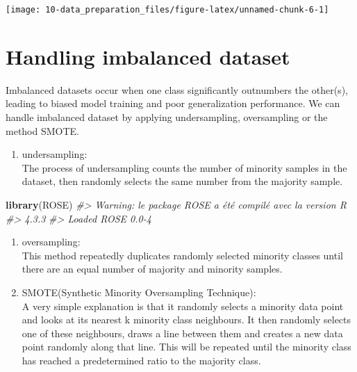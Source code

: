 \documentclass[
]{book}
\newenvironment{Shaded}{\begin{snugshade}}{\end{snugshade}}
\newcommand{\CommentTok}[1]{\textcolor[rgb]{0.56,0.35,0.01}{\textit{#1}}}
\newcommand{\FunctionTok}[1]{\textcolor[rgb]{0.13,0.29,0.53}{\textbf{#1}}}
\newcommand{\NormalTok}[1]{#1}
\providecommand{\tightlist}{%
  \setlength{\itemsep}{0pt}\setlength{\parskip}{0pt}}
\begin{document}
\begin{center}\texttt{[image: 10-data\_preparation\_files/figure-latex/unnamed-chunk-6-1]} \end{center}

\hypertarget{handling-imbalanced-dataset}{%
\section{Handling imbalanced dataset}\label{handling-imbalanced-dataset}}

Imbalanced datasets occur when one class significantly outnumbers the other(s), leading to biased model training and poor generalization performance.
We can handle imbalanced dataset by applying undersampling, oversampling or the method SMOTE.

\begin{enumerate}
\def\labelenumi{\arabic{enumi}.}
\tightlist
\item
  undersampling:\\
  The process of undersampling counts the number of minority samples in the dataset, then randomly selects the same number from the majority sample.
\end{enumerate}

\begin{Shaded}
\begin{Highlighting}[]
\FunctionTok{library}\NormalTok{(ROSE)}
\CommentTok{\#\textgreater{} Warning: le package \textquotesingle{}ROSE\textquotesingle{} a été compilé avec la version R}
\CommentTok{\#\textgreater{} 4.3.3}
\CommentTok{\#\textgreater{} Loaded ROSE 0.0{-}4}
\end{Highlighting}
\end{Shaded}

\begin{enumerate}
\def\labelenumi{\arabic{enumi}.}
\setcounter{enumi}{1}
\item
  oversampling:\\
  This method repeatedly duplicates randomly selected minority classes until there are an equal number of majority and minority samples.
\item
  SMOTE(Synthetic Minority Oversampling Technique):\\
  A very simple explanation is that it randomly selects a minority data point and looks at its nearest k minority class neighbours. It then randomly selects one of these neighbours, draws a line between them and creates a new data point randomly along that line. This will be repeated until the minority class has reached a predetermined ratio to the majority class.
\end{enumerate}
\end{document}
